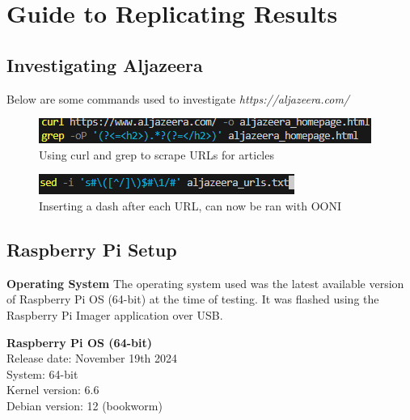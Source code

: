 \section{Guide to Replicating Results}

\subsection{Investigating Aljazeera}
Below are some commands used to investigate \textit{https://aljazeera.com/}

\begin{figure} [H]
    \centering
    \includegraphics[width=0.5\linewidth]{AljazeeraURLs1.png}
    \caption{Using curl and grep to scrape URLs for articles}
    \label{fig:enter-label}
\end{figure}

\begin{figure} [H]
    \centering
\includegraphics[width=0.5\linewidth]{AljazeeraComs2.png}
    \caption{Inserting a dash after each URL, can now be ran with OONI}
    \label{fig:enter-label}
\end{figure}


\subsection{Raspberry Pi Setup}
\textbf{Operating System}
The operating system used was the latest available version of Raspberry Pi OS (64-bit) at the time of testing. It was flashed using the Raspberry Pi Imager application over USB. 

\begin{flushleft}
\hspace{1em}\textbf{Raspberry Pi OS (64-bit)}\\[0.5em]
\hspace{1em}Release date: November 19th 2024\\[0.5em]
\hspace{1em}System: 64-bit\\[0.5em]
\hspace{1em}Kernel version: 6.6\\[0.5em]
\hspace{1em}Debian version: 12 (bookworm)
\end{flushleft}


